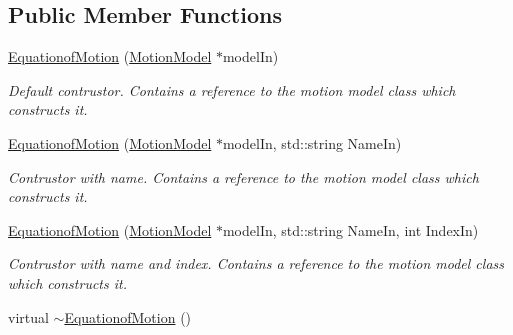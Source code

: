 \subsection*{Public Member Functions}
\begin{DoxyCompactItemize}
\item 
\hyperlink{classosea_1_1ofreq_1_1_equationof_motion_a61c6e25419cf9c5402a4e30496ef6b19}{Equationof\-Motion} (\hyperlink{classosea_1_1ofreq_1_1_motion_model}{Motion\-Model} $\ast$model\-In)
\begin{DoxyCompactList}\small\item\em Default contrustor. Contains a reference to the motion model class which constructs it. \end{DoxyCompactList}\item 
\hyperlink{classosea_1_1ofreq_1_1_equationof_motion_adb22faa7fbb72f4ee01931fe6b9571ee}{Equationof\-Motion} (\hyperlink{classosea_1_1ofreq_1_1_motion_model}{Motion\-Model} $\ast$model\-In, std\-::string Name\-In)
\begin{DoxyCompactList}\small\item\em Contrustor with name. Contains a reference to the motion model class which constructs it. \end{DoxyCompactList}\item 
\hyperlink{classosea_1_1ofreq_1_1_equationof_motion_a334a999be59f6cba06cbbb2cf3134ad9}{Equationof\-Motion} (\hyperlink{classosea_1_1ofreq_1_1_motion_model}{Motion\-Model} $\ast$model\-In, std\-::string Name\-In, int Index\-In)
\begin{DoxyCompactList}\small\item\em Contrustor with name and index. Contains a reference to the motion model class which constructs it. \end{DoxyCompactList}\item 
\hypertarget{classosea_1_1ofreq_1_1_equationof_motion_ab06097df1a54719d7a5682babbd9f233}{virtual \hyperlink{classosea_1_1ofreq_1_1_equationof_motion_ab06097df1a54719d7a5682babbd9f233}{$\sim$\-Equationof\-Motion} ()}\label{classosea_1_1ofreq_1_1_equationof_motion_ab06097df1a54719d7a5682babbd9f233}


\end{DoxyCompactItemize}
